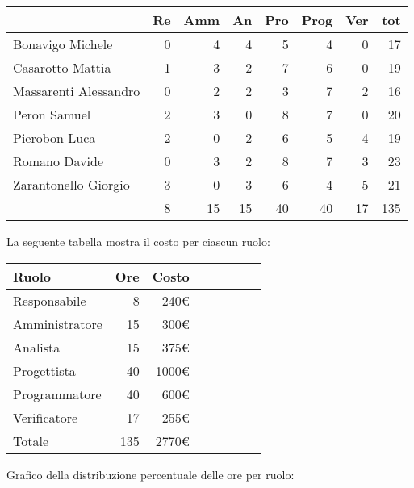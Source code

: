 \begin{table}[H]
    \begin{tabularx}{\linewidth}{X|rrrrrrr}
    \rowcolor{gray!30}& Re & Amm & An & Pro & Prog & Ver & tot \\
    \hline
    Bonavigo Michele                        & 0 & 4 & 4 & 5 & 4 & 0 & 17 \\
    \rowcolor{gray!10}Casarotto Mattia      & 1 & 3 & 2 & 7 & 6 & 0 & 19 \\
    Massarenti Alessandro                   & 0 & 2 & 2 & 3 & 7 & 2 & 16 \\
    \rowcolor{gray!10}Peron Samuel          & 2 & 3 & 0 & 8 & 7 & 0 & 20 \\
    Pierobon Luca                           & 2 & 0 & 2 & 6 & 5 & 4 & 19 \\
    \rowcolor{gray!10}Romano Davide         & 0 & 3 & 2 & 8 & 7 & 3 & 23 \\
    Zarantonello Giorgio                    & 3 & 0 & 3 & 6 & 4 & 5 & 21 \\
    \hline                                  & 8 & 15 & 15 & 40 & 40 & 17 & 135 \\ 
    \end{tabularx}
\end{table}

La seguente tabella mostra il costo per ciascun ruolo:
\begin{table}[H]
    \begin{tabularx}{\linewidth}{X|rrrrrrr}
    \rowcolor{gray!30}Ruolo & Ore & Costo \\
    \hline
    Responsabile                            & 8  & 240€ \\
    \rowcolor{gray!10}Amministratore        & 15  & 300€ \\
    Analista                                & 15  & 375€ \\
    \rowcolor{gray!10}Progettista           & 40  & 1000€ \\
    Programmatore                           & 40  & 600€ \\
    \rowcolor{gray!10}Verificatore          & 17  & 255€ \\
    \hline Totale                           & 135  & 2770€ \\ 
    \end{tabularx}
\end{table}

Grafico della distribuzione percentuale delle ore per ruolo:
\begin{center}
\end{center}

